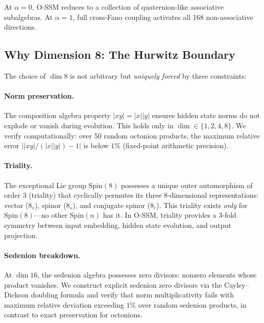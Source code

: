 \documentclass{article}
\begin{document}
At $\alpha = 0$, O-SSM reduces to a collection of quaternion-like associative subalgebras.
At $\alpha = 1$, full cross-Fano coupling activates all 168 non-associative directions.

\subsection{Why Dimension 8: The Hurwitz Boundary}
\label{sec:dim8}

The choice of $\dim 8$ is not arbitrary but \emph{uniquely forced} by three constraints:

\paragraph{Norm preservation.} The composition algebra property $|xy| = |x||y|$ ensures hidden state norms do not explode or vanish during evolution. This holds only in $\dim \in \{1, 2, 4, 8\}$. We verify computationally: over 50 random octonion products, the maximum relative error $||xy|/(|x||y|) - 1|$ is below $1\%$ (fixed-point arithmetic precision).

\paragraph{Triality.} The exceptional Lie group $\mathrm{Spin}(8)$ possesses a unique outer automorphism of order 3 (triality) that cyclically permutes its three 8-dimensional representations: vector ($8_v$), spinor ($8_s$), and conjugate spinor ($8_c$). This triality exists \emph{only} for $\mathrm{Spin}(8)$---no other $\mathrm{Spin}(n)$ has it. In O-SSM, triality provides a 3-fold symmetry between input embedding, hidden state evolution, and output projection.

\paragraph{Sedenion breakdown.} At $\dim 16$, the sedenion algebra possesses zero divisors: nonzero elements whose product vanishes. We construct explicit sedenion zero divisors via the Cayley--Dickson doubling formula and verify that norm multiplicativity fails with maximum relative deviation exceeding $1\%$ over random sedenion products, in contrast to exact preservation for octonions.

\end{document}
